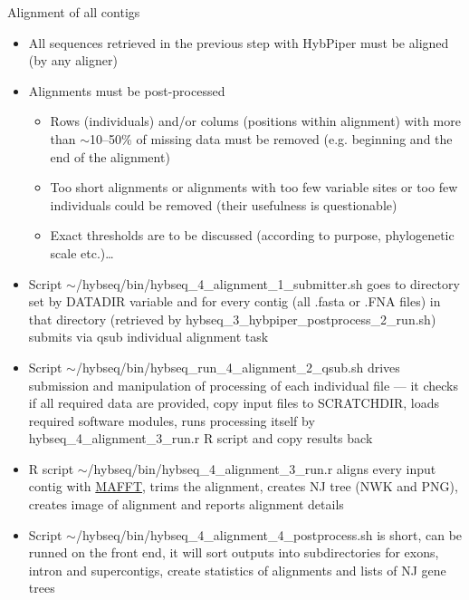\documentclass[compress,  xelatex, 11pt, xcolor=x11names, aspectratio=169,
	hyperref={
		bookmarks=true,
		unicode=true,
		colorlinks=true,
		pdftitle={HybSeq course},
		plainpages=false,
		pdfauthor={Vojtech Zeisek},
		pdfsubject={Practical processing of HybSeq target enrichment sequencing data on computing grids like MetaCentrum},
		pdfcreator={XeLaTeX},
		pdfkeywords={BASH, command line, GNU, HybSeq, Linux, MetaCentrum, sequencing shell, target enrichment},
		linkcolor=Turquoise4, %
		anchorcolor=DodgerBlue4, %
		citecolor=DodgerBlue4, %
		filecolor=DodgerBlue4, %
		menucolor=Tan4, %
		urlcolor=DarkOliveGreen4 %
		},
	url={hyphens, lowtilde} %
	]{beamer}
\renewcommand{\texttt}[1]{\colorbox{Cornsilk2}{{\ttfamily #1}}}
\begin{document}
\begin{frame}[allowframebreaks]{Alignment of all contigs}
	\begin{itemize}
		\item All sequences retrieved in the previous step with HybPiper must be aligned (by any aligner)
		\item Alignments must be post-processed
		\begin{itemize}
			\item Rows (individuals) and/or colums (positions within alignment) with more than $\sim$10--50\% of missing data must be removed (e.g. beginning and the end of the alignment)
			\item Too short alignments or alignments with too few variable sites or too few individuals could be removed (their usefulness is questionable)
			\item Exact thresholds are to be discussed (according to purpose, phylogenetic scale etc.)\ldots
		\end{itemize}
		\item Script \texttt{$\sim$/hybseq/bin/hybseq\_4\_alignment\_1\_submitter.sh} goes to directory set by \texttt{DATADIR} variable and for every contig (all \texttt{*.fasta} or \texttt{*.FNA} files) in that directory (retrieved by \texttt{hybseq\_3\_hybpiper\_postprocess\_2\_run.sh}) submits via \texttt{qsub} individual alignment task
		\item Script \texttt{$\sim$/hybseq/bin/hybseq\_run\_4\_alignment\_2\_qsub.sh} drives submission and manipulation of processing of each individual file --- it checks if all required data are provided, copy input files to \texttt{SCRATCHDIR}, loads required software modules, runs processing itself by \texttt{hybseq\_4\_alignment\_3\_run.r} \texttt{R} script and copy results back
		\item \texttt{R} script \texttt{$\sim$/hybseq/bin/hybseq\_4\_alignment\_3\_run.r} aligns every input contig with \href{https://mafft.cbrc.jp/alignment/software/}{MAFFT}, trims the alignment, creates NJ tree (NWK and PNG), creates image of alignment and reports alignment details
		\item Script \texttt{$\sim$/hybseq/bin/hybseq\_4\_alignment\_4\_postprocess.sh} is short, can be runned on the front end, it will sort outputs into subdirectories for exons, intron and supercontigs, create statistics of alignments and lists of NJ gene trees
	\end{itemize}
\end{frame}
\end{document}
